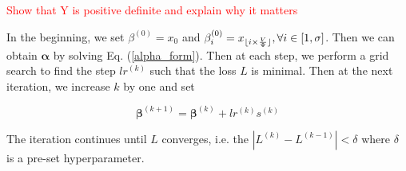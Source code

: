 \textcolor{red}{Show that Y is positive definite and explain why it matters}  

In the beginning, we set $\beta^{(0)}=x_0$ and $\beta_i^{(0)}=x_{\lfloor i\times \frac{V}{\Psi}\rfloor}, \forall i\in[1,\sigma]$. Then we can obtain $\boldsymbol{\alpha}$ by solving Eq. (\ref{alpha_form}). Then at each step, we perform a grid search to find the step $lr^{(k)}$ such that the loss $L$ is minimal. Then at the next iteration, we increase $k$ by one and set 

$$
\boldsymbol{\beta}^{(k+1)}=\boldsymbol{\beta}^{(k)} + lr^{(k)}s^{(k)}
$$

The iteration continues until $L$ converges, i.e. the $|L^{(k)}-L^{(k-1)}|<\delta$ where $\delta$ is a pre-set hyperparameter.


























